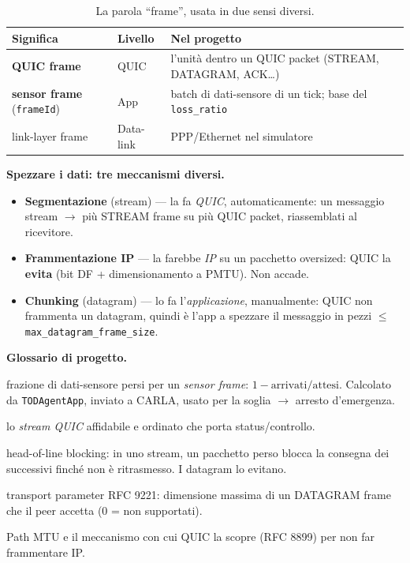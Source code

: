 \documentclass[11pt,a4paper]{article}
\newcommand{\code}[1]{\texttt{#1}}
\begin{document}
\begin{table}[h]\centering\small
\caption{La parola ``frame'', usata in due sensi diversi.}
\begin{tabularx}{\textwidth}{@{}l l X@{}}
\toprule
\textbf{Significa} & \textbf{Livello} & \textbf{Nel progetto}\\
\midrule
\textbf{QUIC frame} & QUIC & l'unit\`a dentro un QUIC packet (STREAM, DATAGRAM, ACK\dots)\\
\textbf{sensor frame} (\code{frameId}) & App & batch di dati-sensore di un tick; base del \code{loss\_ratio}\\
link-layer frame & Data-link & PPP/Ethernet nel simulatore\\
\bottomrule
\end{tabularx}
\end{table}

\noindent\textbf{Spezzare i dati: tre meccanismi diversi.}
\begin{itemize}[nosep,leftmargin=1.4em]
  \item \textbf{Segmentazione} (stream) --- la fa \emph{QUIC}, automaticamente: un messaggio stream $\to$
    pi\`u STREAM frame su pi\`u QUIC packet, riassemblati al ricevitore.
  \item \textbf{Frammentazione IP} --- la farebbe \emph{IP} su un pacchetto oversized: QUIC la \textbf{evita}
    (bit DF + dimensionamento a PMTU). Non accade.
  \item \textbf{Chunking} (datagram) --- lo fa l'\emph{applicazione}, manualmente: QUIC non frammenta un
    datagram, quindi \`e l'app a spezzare il messaggio in pezzi $\le$ \code{max\_datagram\_frame\_size}.
\end{itemize}

\noindent\textbf{Glossario di progetto.}
\begin{description}[leftmargin=0pt,style=nextline,itemsep=1pt]
  \item[\code{loss\_ratio}] frazione di dati-sensore persi per un \emph{sensor frame}: $1-\text{arrivati}/\text{attesi}$. Calcolato da \code{TODAgentApp}, inviato a CARLA, usato per la soglia $\to$ arresto d'emergenza.
  \item[stream 0] lo \emph{stream QUIC} affidabile e ordinato che porta status/controllo.
  \item[HoL blocking] head-of-line blocking: in uno stream, un pacchetto perso blocca la consegna dei successivi finch\'e non \`e ritrasmesso. I datagram lo evitano.
  \item[\code{max\_datagram\_frame\_size}] transport parameter RFC 9221: dimensione massima di un DATAGRAM frame che il peer accetta (0 = non supportati).
  \item[PMTU / DPLPMTUD] Path MTU e il meccanismo con cui QUIC la scopre (RFC 8899) per non far frammentare IP.
\end{description}
\end{document}
